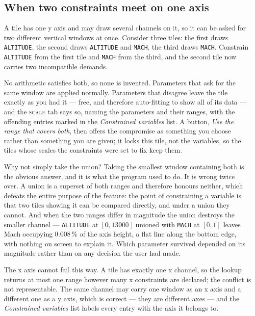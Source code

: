 \documentclass[11pt,a4paper,oneside]{report}
\newcommand{\code}[1]{\texttt{#1}}
\newcommand{\tab}[1]{\textsc{#1}}
\begin{document}
\subsection{When two constraints meet on one axis}

A tile has one y axis and may draw several channels on it, so it can be asked for
two different vertical windows at once. Consider three tiles: the first draws
\code{ALTITUDE}, the second draws \code{ALTITUDE} and \code{MACH}, the third
draws \code{MACH}. Constrain \code{ALTITUDE} from the first tile and \code{MACH}
from the third, and the second tile now carries two incompatible demands.

No arithmetic satisfies both, so none is invented. Parameters that ask for the
same window are applied normally. Parameters that disagree leave the tile exactly
as you had it --- free, and therefore auto-fitting to show all of its data ---
and the \tab{scale} tab says so, naming the parameters and their ranges, with the
offending entries marked in the \emph{Constrained variables} list. A button,
\emph{Use the range that covers both}, then offers the compromise as something
you choose rather than something you are given; it locks this tile, not the
variables, so the tiles whose scales the constraints were set to fix keep them.

\begin{aoenote}{Why not simply take the union?}
Taking the smallest window containing both is the obvious answer, and it is what
the program used to do. It is wrong twice over. A union is a superset of both
ranges and therefore honours neither, which defeats the entire purpose of the
feature: the point of constraining a variable is that two tiles showing it can be
compared directly, and under a union they cannot. And when the two ranges differ
in magnitude the union destroys the smaller channel --- \code{ALTITUDE} at
$[0, 13000]$ unioned with \code{MACH} at $[0, 1]$ leaves Mach occupying
0.008\,\% of the axis height, a flat line along the bottom edge, with nothing on
screen to explain it. Which parameter survived depended on its magnitude rather
than on any decision the user had made.
\end{aoenote}

The x axis cannot fail this way. A tile has exactly one x channel, so the lookup
returns at most one range however many x constraints are declared; the conflict
is not representable. The same channel may carry one window as an x axis and a
different one as a y axis, which is correct --- they are different axes --- and
the \emph{Constrained variables} list labels every entry with the axis it belongs
to.
\end{document}
